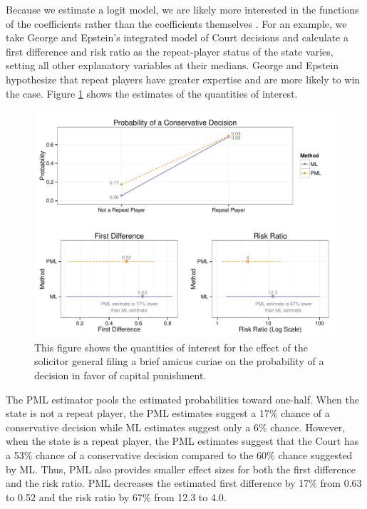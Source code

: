 \documentclass[12pt]{article}
\begin{document}
Because we estimate a logit model, we are likely more interested in the functions of the coefficients rather than the coefficients themselves \citep{KingTomzWittenberg2000}.
For an example, we take George and Epstein's integrated model of Court decisions and calculate a first difference and risk ratio as the repeat-player status of the state varies, setting all other explanatory variables at their medians.
George and Epstein hypothesize that repeat players have greater expertise and are more likely to win the case.
Figure \ref{fig:ge-qis} shows the estimates of the quantities of interest.
\begin{figure}[h]
\begin{center}
\includegraphics[width = \textwidth]{figs/ge-qis.pdf}
\caption{This figure shows the quantities of interest for the effect of the solicitor general filing a brief amicus curiae on the probability of a decision in favor of capital punishment.}\label{fig:ge-qis}
\end{center}
\end{figure}
The PML estimator pools the estimated probabilities toward one-half. When the state is not a repeat player, the PML estimates suggest a 17\% chance of a conservative decision while ML estimates suggest only a 6\% chance.
However, when the state is a repeat player, the PML estimates suggest that the Court has a 53\% chance of a conservative decision compared to the 60\% chance suggested by ML.
Thus, PML also provides smaller effect sizes for both the first difference and the risk ratio.
PML decreases the estimated first difference by 17\% from 0.63 to 0.52 and the risk ratio by 67\% from 12.3 to 4.0.
\end{document}
